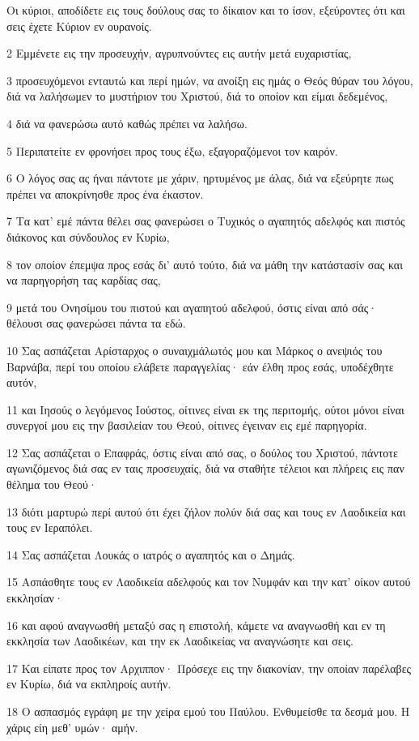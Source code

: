 \par Οι κύριοι, αποδίδετε εις τους δούλους σας το δίκαιον και το ίσον, εξεύροντες ότι και σεις έχετε Κύριον εν ουρανοίς.
\par 2 Εμμένετε εις την προσευχήν, αγρυπνούντες εις αυτήν μετά ευχαριστίας,
\par 3 προσευχόμενοι ενταυτώ και περί ημών, να ανοίξη εις ημάς ο Θεός θύραν του λόγου, διά να λαλήσωμεν το μυστήριον του Χριστού, διά το οποίον και είμαι δεδεμένος,
\par 4 διά να φανερώσω αυτό καθώς πρέπει να λαλήσω.
\par 5 Περιπατείτε εν φρονήσει προς τους έξω, εξαγοραζόμενοι τον καιρόν.
\par 6 Ο λόγος σας ας ήναι πάντοτε με χάριν, ηρτυμένος με άλας, διά να εξεύρητε πως πρέπει να αποκρίνησθε προς ένα έκαστον.
\par 7 Τα κατ' εμέ πάντα θέλει σας φανερώσει ο Τυχικός ο αγαπητός αδελφός και πιστός διάκονος και σύνδουλος εν Κυρίω,
\par 8 τον οποίον έπεμψα προς εσάς δι' αυτό τούτο, διά να μάθη την κατάστασίν σας και να παρηγορήση τας καρδίας σας,
\par 9 μετά του Ονησίμου του πιστού και αγαπητού αδελφού, όστις είναι από σάς· θέλουσι σας φανερώσει πάντα τα εδώ.
\par 10 Σας ασπάζεται Αρίσταρχος ο συναιχμάλωτός μου και Μάρκος ο ανεψιός του Βαρνάβα, περί του οποίου ελάβετε παραγγελίας· εάν έλθη προς εσάς, υποδέχθητε αυτόν,
\par 11 και Ιησούς ο λεγόμενος Ιούστος, οίτινες είναι εκ της περιτομής, ούτοι μόνοι είναι συνεργοί μου εις την βασιλείαν του Θεού, οίτινες έγειναν εις εμέ παρηγορία.
\par 12 Σας ασπάζεται ο Επαφράς, όστις είναι από σας, ο δούλος του Χριστού, πάντοτε αγωνιζόμενος διά σας εν ταις προσευχαίς, διά να σταθήτε τέλειοι και πλήρεις εις παν θέλημα του Θεού·
\par 13 διότι μαρτυρώ περί αυτού ότι έχει ζήλον πολύν διά σας και τους εν Λαοδικεία και τους εν Ιεραπόλει.
\par 14 Σας ασπάζεται Λουκάς ο ιατρός ο αγαπητός και ο Δημάς.
\par 15 Ασπάσθητε τους εν Λαοδικεία αδελφούς και τον Νυμφάν και την κατ' οίκον αυτού εκκλησίαν·
\par 16 και αφού αναγνωσθή μεταξύ σας η επιστολή, κάμετε να αναγνωσθή και εν τη εκκλησία των Λαοδικέων, και την εκ Λαοδικείας να αναγνώσητε και σεις.
\par 17 Και είπατε προς τον Αρχιππον· Πρόσεχε εις την διακονίαν, την οποίαν παρέλαβες εν Κυρίω, διά να εκπληροίς αυτήν.
\par 18 Ο ασπασμός εγράφη με την χείρα εμού του Παύλου. Ενθυμείσθε τα δεσμά μου. Η χάρις είη μεθ' υμών· αμήν.


